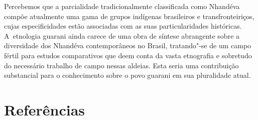 

Percebemos que a parcialidade tradicionalmente classificada como
Nhandéva compõe atualmente uma gama de grupos indígenas brasileiros e
transfronteiriços, cujas especificidades estão associadas com as suas
particularidades históricas. A~etnologia guarani ainda carece de uma
obra de síntese abrangente sobre a diversidade dos Nhandéva
contemporâneos no Brasil, tratando"-se de um campo fértil para estudos
comparativos que deem conta da vasta etnografia e sobretudo do
necessário trabalho de campo nessas aldeias. Esta seria uma
contribuição substancial para o conhecimento sobre o povo guarani em
sua pluralidade atual. 

\section{Referências}

